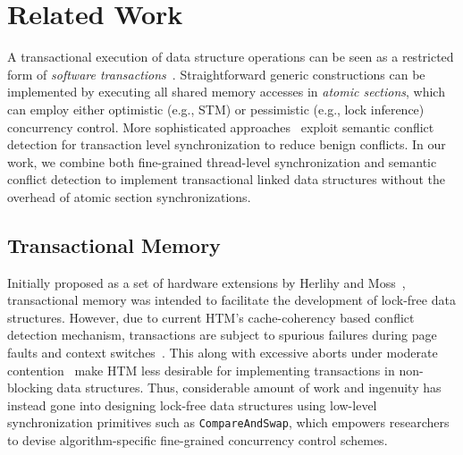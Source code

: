 \documentclass[10pt,conference,compsocconf]{IEEEtran}
\begin{document}
\section{Related Work}
\label{sec:related}
A transactional execution of data structure operations can be seen as a restricted form of \emph{software transactions}~\cite{harris2010transactional}.
Straightforward generic constructions can be implemented by executing all shared memory accesses in \emph{atomic sections}, which can employ either optimistic (e.g., STM) or pessimistic (e.g., lock inference) concurrency control.
More sophisticated approaches~\cite{bronson2010transactional,herlihy2008transactional,golan2015automatic} exploit semantic conflict detection for transaction level synchronization to reduce benign conflicts.
In our work, we combine both fine-grained thread-level synchronization and semantic conflict detection to implement transactional linked data structures without the overhead of atomic section synchronizations.

\subsection{Transactional Memory}
Initially proposed as a set of hardware extensions by Herlihy and Moss~\cite{herlihy1993transactional}, transactional memory was intended to facilitate the development of lock-free data structures.
However, due to current HTM's cache-coherency based conflict detection mechanism, transactions are subject to spurious failures during page faults and context switches~\cite{dice2009early}.
This along with excessive aborts under moderate contention~\cite{christina2015resource} make HTM less desirable for implementing transactions in non-blocking data structures.
Thus, considerable amount of work and ingenuity has instead gone into designing lock-free data structures using low-level synchronization primitives such as \texttt{CompareAndSwap}, which empowers researchers to devise algorithm-specific fine-grained concurrency control schemes.
\end{document}
